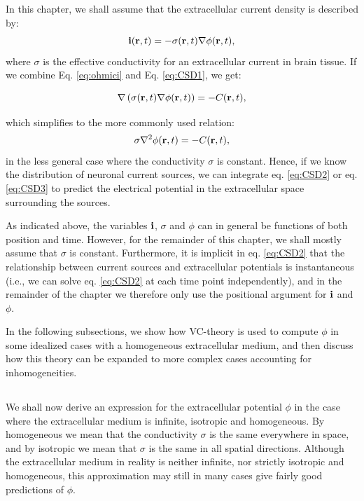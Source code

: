 In this chapter, we shall assume that the extracellular current density is described by:
\begin{equation}
{\bf i}({\bf r}, t) = - \sigma({\bf r}, t) \nabla \phi({\bf r}, t),
\label{eq:ohmici}
\end{equation}
where $\sigma$ is the effective conductivity for an extracellular current in brain tissue. If we combine Eq. \ref{eq:ohmici} and Eq. \ref{eq:CSD1}, we get:

\begin{equation}
\nabla \left( \sigma({\bf r}, t) \nabla \phi({\bf r}, t) \right) = - C({\bf r}, t),
\label{eq:CSD2}
\end{equation}

which simplifies to the more commonly used relation:
\begin{equation}
\sigma \nabla^2\phi({\bf r}, t) = - C({\bf r}, t),
\label{eq:CSD3}
\end{equation}
in the less general case where the conductivity $\sigma$ is constant. Hence, if we know the distribution of neuronal current sources, we can integrate eq. \ref{eq:CSD2} or eq. \ref{eq:CSD3} to predict the electrical potential in the extracellular space surrounding the sources. 

As indicated above, the variables ${\bf i}$, $\sigma$ and $\phi$ can in general be functions of both position and time. However, for the remainder of this chapter, we shall mostly assume that $\sigma$ is constant. Furthermore, it is implicit in eq. \ref{eq:CSD2} that the relationship between current sources and extracellular potentials is instantaneous (i.e., we can solve eq.  \ref{eq:CSD2} at each time point independently), and in the remainder of the chapter we therefore only use the positional argument for ${\bf i}$ and $\phi$. 

In the following subsections, we show how VC-theory is used to compute $\phi$ in some idealized cases with a homogeneous extracellular medium, and then discuss how this theory can be expanded to more complex cases accounting for inhomogeneities. 


\subsection{}
\label{sec:isohomo}
We shall now derive an expression for the extracellular potential $\phi$ in the case where the extracellular medium is infinite, isotropic and homogeneous. By homogeneous we mean that the conductivity $\sigma$ is the same everywhere in space, and by isotropic we mean that $\sigma$ is the same in all spatial directions. Although the extracellular medium in reality is neither infinite, nor strictly isotropic and homogeneous, this approximation may still in many cases give fairly good predictions of $\phi$.


